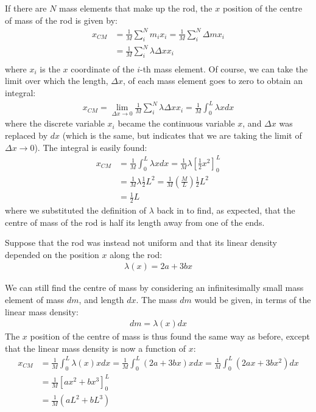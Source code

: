If there are $N$ mass elements that make up the rod, the $x$ position of the centre of mass of the rod is given by:
\begin{align*}
x_{CM} &= \frac{1}{M}\sum_i^N m_i x_i = \frac{1}{M}\sum_i^N \Delta m x_i \\
&=\frac{1}{M}\sum_i^N \lambda \Delta x x_i\\
\end{align*}
where $x_i$ is the $x$ coordinate of the $i$-th mass element. Of course, we can take the limit over which the length, $\Delta x$, of each mass element goes to zero to obtain an integral:
\begin{align*}
x_{CM} = \lim_{\Delta x \to 0} \frac{1}{M}\sum_i^N \lambda \Delta x x_i = \frac{1}{M} \int_0^L \lambda x dx
\end{align*} 
where the discrete variable $x_i$ became the continuous variable $x$, and $\Delta x$ was replaced by $dx$ (which is the same, but indicates that we are taking the limit of $\Delta x \to 0$). The integral is easily found:
\begin{align*}
x_{CM} &= \frac{1}{M} \int_0^L \lambda x dx = \frac{1}{M}\lambda \left[ \frac{1}{2} x^2\right]_0^L\\
&=\frac{1}{M}\lambda \frac{1}{2} L^2 = \frac{1}{M}\left( \frac{M}{L}\right) \frac{1}{2} L^2\\
&=\frac{1}{2}L
\end{align*}
where we substituted the definition of $\lambda$ back in to find, as expected, that the centre of mass of the rod is half its length away from one of the ends.

Suppose that the rod was instead not uniform and that its linear density depended on the position $x$ along the rod:
\begin{align*}
\lambda(x) = 2a + 3bx
\end{align*}

We can still find the centre of mass by considering an infinitesimally small mass element of mass $dm$, and length $dx$. The mass $dm$ would be given, in terms of the linear mass density:
\begin{align*}
dm = \lambda(x) dx
\end{align*}
The $x$ position of the centre of mass is thus found the same way as before, except that the linear mass density is now a function of $x$:
\begin{align*}
x_{CM} &= \frac{1}{M} \int_0^L \lambda(x) x dx =\frac{1}{M} \int_0^L (2a + 3bx) x dx=\frac{1}{M} \int_0^L (2ax + 3bx^2) dx\\
&=\frac{1}{M}  \left[  ax^2 + bx^3  \right]_0^L\\
&=\frac{1}{M} (aL^2 + bL^3 )
\end{align*}

